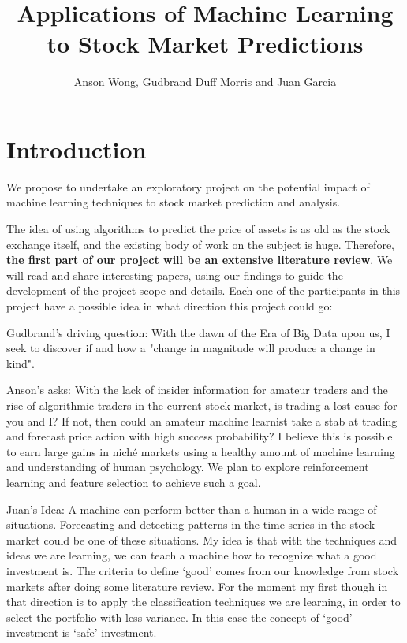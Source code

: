 \documentclass[12pt, oneside]{article}
\title{Applications of Machine Learning to Stock Market Predictions}
\author{Anson Wong, Gudbrand Duff Morris and Juan Garcia}
\def\blu#1{{\color{blu}#1}}
\begin{document}
\maketitle
\flushleft
\section*{Introduction}

We propose to undertake an exploratory project on the potential impact of machine learning techniques to stock market prediction and analysis. 

The idea of using algorithms to predict the price of assets is as old as the stock exchange itself, and the existing body of work on the subject is huge. Therefore, \textbf
{the first part of our project will be an extensive literature review}. We will read and share interesting papers, using our findings to guide the development of the project scope and details.
\newline
Each one of the participants in this project have a possible idea in what direction this project could go:

\blu{Gudbrand's driving question:} With the dawn of the Era of Big Data upon us, I seek to discover if and how a "change in magnitude will produce a change in kind".

\blu{Anson's asks:} With the lack of insider information for amateur traders and the rise of algorithmic traders in the current stock market, is trading a lost cause for you and I? If not, then could an amateur machine learnist take a stab at trading and forecast price action with high success probability? I believe this is possible to earn large gains in nich\'{e} markets using a healthy amount of machine learning and understanding of human psychology. We plan to explore reinforcement learning and feature selection to achieve such a goal.

\blu{Juan's Idea:} A machine can perform better than a human in a wide range of situations. Forecasting and detecting patterns in the time series in the stock market could be one of these situations.
My idea is that with the techniques and ideas we are learning, we can teach a machine how to recognize what a good investment is. The criteria to define `good' comes from our knowledge 
from stock markets after doing some literature review. For the moment my first though in that direction is to apply the classification techniques we are learning,  in order to select the portfolio
with less variance. In this case the concept of `good' investment is `safe' investment.
\newline
\end{document}
